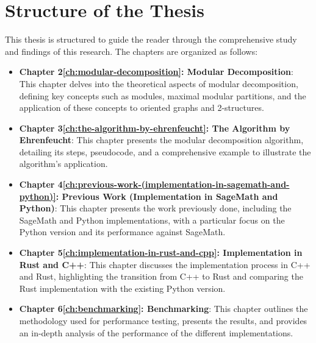 \section{Structure of the Thesis}\label{sec:structure-of-the-thesis}

This thesis is structured to guide the reader through the comprehensive study and findings of this research.
The chapters are organized as follows:

\begin{itemize}
    \item \textbf{Chapter 2\ref{ch:modular-decomposition}: Modular Decomposition}: This chapter delves into the theoretical aspects of modular decomposition, defining key concepts such as modules, maximal modular partitions, and the application of these concepts to oriented graphs and 2-structures.
    \item \textbf{Chapter 3\ref{ch:the-algorithm-by-ehrenfeucht}: The Algorithm by Ehrenfeucht}: This chapter presents the modular decomposition algorithm, detailing its steps, pseudocode, and a comprehensive example to illustrate the algorithm's application.
    \item \textbf{Chapter 4\ref{ch:previous-work-(implementation-in-sagemath-and-python)}: Previous Work (Implementation in SageMath and Python)}: This chapter presents the work previously done, including the SageMath and Python implementations, with a particular focus on the Python version and its performance against SageMath.
    \item \textbf{Chapter 5\ref{ch:implementation-in-rust-and-cpp}: Implementation in Rust and C++}: This chapter discusses the implementation process in C++ and Rust, highlighting the transition from C++ to Rust and comparing the Rust implementation with the existing Python version.
    \item \textbf{Chapter 6\ref{ch:benchmarking}: Benchmarking}: This chapter outlines the methodology used for performance testing, presents the results, and provides an in-depth analysis of the performance of the different implementations.
\end{itemize}

